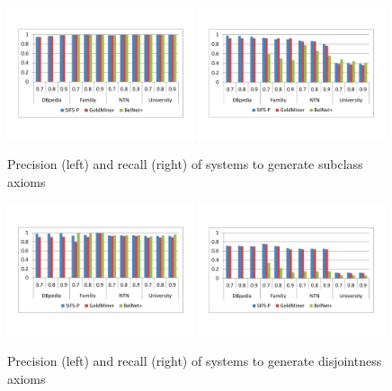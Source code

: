 \begin{figure}
  \centering
  \includegraphics[width=0.49\textwidth]{figs/precision-subc.pdf}
  \includegraphics[width=0.49\textwidth]{figs/recall-subc.pdf}
  \caption{Precision (left) and recall (right) of systems to generate subclass axioms}\label{fig:precision-recall-subc}
\end{figure}
\begin{figure}
  \centering
  \includegraphics[width=0.49\textwidth]{figs/precision-disj.pdf}
  \includegraphics[width=0.49\textwidth]{figs/recall-disj.pdf}
  \caption{Precision (left) and recall (right) of systems to generate disjointness axioms}\label{fig:precision-recall-disj}
\end{figure}

